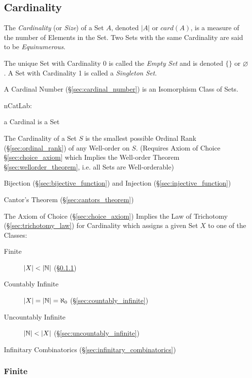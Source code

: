 \subsection{Cardinality}\label{sec:cardinality}

The \emph{Cardinality} (or \emph{Size}) of a Set $A$, denoted $|A|$ or
$card(A)$, is a measure of the number of Elements in the Set. Two Sets
with the same Cardinality are said to be \emph{Equinumerous}.

The unique Set with Cardinality 0 is called the \emph{Empty Set} and
is denoted $\{\}$ or $\varnothing$. A Set with Cardinality 1 is called a
\emph{Singleton Set}.

A Cardinal Number (\S\ref{sec:cardinal_number}) is an Isomorphism
Class of Sets.

nCatLab:

a Cardinal is a Set

The Cardinality of a Set $S$ is the smallest possible Ordinal Rank
(\S\ref{sec:ordinal_rank}) of any Well-order on $S$. (Requires Axiom
of Choice \S\ref{sec:choice_axiom} which Implies the Well-order
Theorem \S\ref{sec:wellorder_theorem}, i.e. all Sets are
Well-orderable)

Bijection (\S\ref{sec:bijective_function}) and Injection
(\S\ref{sec:injective_function})

Cantor's Theorem (\S\ref{sec:cantors_theorem})

The Axiom of Choice (\S\ref{sec:choice_axiom}) Implies the Law of
Trichotomy (\S\ref{sec:trichotomy_law}) for Cardinality which assigns
a given Set $X$ to one of the Classes:

\begin{description}
\item [Finite] $|X| < |\mathbb{N}|$ (\S\ref{sec:finite_cardinality})
\item [Countably Infinite] $|X| = |\mathbb{N}| = \aleph_0$
  (\S\ref{sec:countably_infinite})
\item [Uncountably Infinite] $|\mathbb{N}| < |X|$
  (\S\ref{sec:uncountably_infinite})
\end{description}

Infinitary Combinatorics (\S\ref{sec:infinitary_combinatorics})



\subsubsection{Finite}\label{sec:finite_cardinality}

